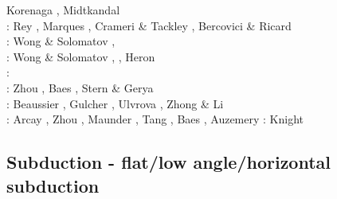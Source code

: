 \begin{scriptsize}
                      Korenaga \cite{kore13}, Midtkandal \etal \cite{mibg13}\\
\twothousandfourteen: Rey \etal \cite{recf14}, Marques \etal \cite{macg14},
                      Crameri \& Tackley \cite{crta14}, Bercovici \& Ricard \cite{beri14}\\
\twothousandfifteen: Wong \& Solomatov \cite{woso15}, \cite{matv15}
                     \cite{pebu15}\cite{vapm15}\cite{legu15}\cite{gesb15}\\
\twothousandsixteen: Wong \& Solomatov \cite{woso16a}, \cite{crta16}
                     \cite{maka16}\cite{bags16}, 
                     Heron \etal \cite{heps16}\\
\twothousandseventeen: \cite{magm17}\\
\twothousandeighteen: Zhou \etal \cite{zhlg18}, Baes \etal \cite{basq18}, Stern \& Gerya \cite{stge18} \\
\twothousandnineteen: Beaussier \etal \cite{begb19}, Gulcher \etal \cite{gubg19}, 
                      Ulvrova \etal \cite{ulcw19}, Zhong \& Li \cite{zhli19}\\
\twothousandtwenty: Arcay \etal \cite{arla20}, Zhou \etal \cite{zhlg20}, 
                    Maunder \etal \cite{mapg20}, Tang \etal \cite{tawm20}, 
                    Baes \etal \cite{basg20b}, Auzemery \etal \cite{auwy20}
\twothousandtwentyone: Knight \etal \cite{kndc21}
\end{scriptsize}

\subsection{Subduction - flat/low angle/horizontal subduction}

